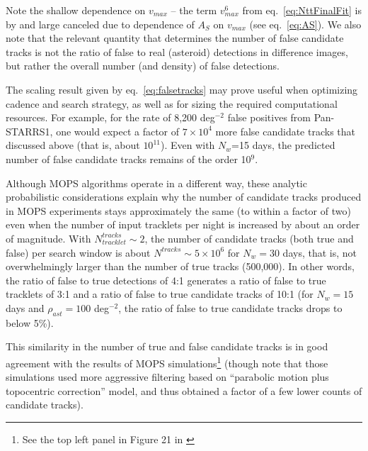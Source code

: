 Note the shallow dependence on $v_{max}$ -- the term $v_{max}^6$
from eq.~\ref{eq:NttFinalFit} is by and large canceled due to dependence of $A_S$ on
$v_{max}$ (see eq.~\ref{eq:AS}). We also note that the relevant quantity that determines
the number of false candidate tracks is not the ratio of false to real (asteroid) detections
in difference images, but rather the overall number (and density) of false detections.

The scaling result given by eq.~\ref{eq:falsetracks} may prove useful when optimizing cadence
and search strategy, as well as for sizing the required computational resources. For example,
for the rate of 8,200 deg$^{-2}$ false positives from Pan-STARRS1, one would expect a factor
of $7\times10^4$ more false candidate tracks that discussed above (that is, about $10^{11}$).
Even with $N_w$=15 days, the predicted number of false candidate tracks remains of the
order 10$^9$.

Although MOPS algorithms operate in a different way, these analytic probabilistic considerations
explain why the number of candidate tracks produced in MOPS experiments stays approximately
the same (to within a factor of two) even when the number of input tracklets per night is increased
by about an order of magnitude. With $N_{tracklet}^{tracks} \sim2$, the number of  candidate
tracks (both true and false) per search window is about $N^{tracks} \sim 5\times10^6$ for $N_w= 30$ days,
that is, not overwhelmingly larger than the number of true tracks (500,000). In other words, the ratio of
false to true detections of 4:1 generates a ratio of false to true tracklets of 3:1 and a ratio of false to true
candidate tracks of 10:1 (for $N_w=15$ days and $\rho_{ast}=100$ deg$^{-2}$, the ratio of false to true
candidate tracks drops to below 5\%).

This similarity in the number of true and false candidate tracks is in good
agreement with the results of MOPS simulations\footnote{See the top left panel
in Figure 21 in \citet{LDM-156}} (though note that those simulations used more aggressive filtering
based on ``parabolic motion plus topocentric correction'' model, and thus obtained a factor of a few
lower counts of candidate tracks).
